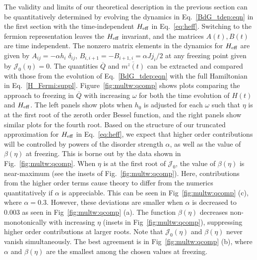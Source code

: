 \documentclass[aps,prl, notitlepage]{revtex4-1}
\begin{document}
The validity and limits of our theoretical description in the previous section can be quantitatively determined by evolving the dynamics in 
Eq.~\ref{BdG_tdep:eqn} in the first section with the time-independent $H_{\rm eff}$ in Eq.~\ref{eq:heff}. 
Switching to the fermion representation leaves the $H_{\rm eff}$ invariant, and the matrices $A(t), B(t)$ 
are time independent. The nonzero matrix elements in the dynamics for $H_{\rm eff}$ are given by
$A_{ij} = -\alpha h_i \; \delta_{ij}$, $B_{i,i+1}=-B_{i+1,i} = \alpha J j_i/2$ at any freezing 
point given by $\mathcal{J}_0(\eta)=0$. The quantities $\overline{Q}$ and $\overline{m^{z}(t)}$ 
can be extracted and compared with those from the evolution of Eq.~\ref{BdG_tdep:eqn} with 
the full Hamiltonian in Eq.~\ref{H_Fermi:suppl}. Figure~\ref{fig:multw:qcomp} shows plots comparing the approach to 
freezing in $\overline{Q}$ with increasing $\omega$ for both the time evolution of $H(t)$ and $H_{\rm eff}$. 
The left panels show plots when $h_0$ is adjusted for each $\omega$ such that $\eta$ is at the first 
root of the zeroth order Bessel function, and the right panels show similar plots for the fourth root. 
Based on the structure of our truncated approximation for $H_{\rm eff}$ in Eq.~\ref{eq:heff}, we expect 
that higher order contributions will be controlled by powers of the disorder strength $\alpha$, 
as well as the value of $\beta(\eta)$ at freezing. This is borne out by the data shown in Fig.~\ref{fig:multw:qcomp}. 
When $\eta$ is at the first root of $\mathcal{J}_0$, the value of $\beta(\eta)$ is near-maximum (see the insets of Fig.~\ref{fig:multw:qcomp}). Here, contributions from the higher order terms cause theory to differ from the numerics quantitatively if $\alpha$ is appreciable. This can be seen  in Fig~\ref{fig:multw:qcomp} (c), where $\alpha=0.3$. However, these deviations are smaller 
when $\alpha$ is decreased to $0.003$ as seen in Fig~\ref{fig:multw:qcomp} (a). The function $\beta(\eta)$ decreases 
non-monotonically with increasing $\eta$ (insets in Fig~\ref{fig:multw:qcomp}), suppressing higher order contributions at 
larger roots. Note that  $\mathcal{J}_0(\eta)$ and $\beta(\eta)$ never vanish simultaneously. 
The best agreement is in Fig~\ref{fig:multw:qcomp} (b), where $\alpha$ and $\beta(\eta)$ are the smallest among the chosen values at freezing. 
\end{document}
